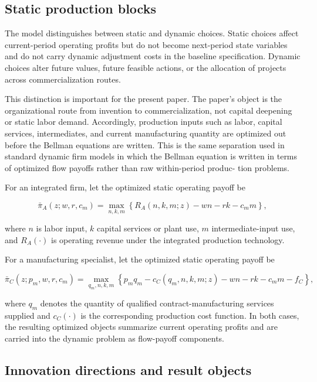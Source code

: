 \documentclass[12pt]{article}
\begin{document}
\subsection{Static production blocks}

The model distinguishes between static and dynamic choices. Static choices affect current-period operating profits but do not become next-period state variables and do not carry dynamic adjustment costs in the baseline specification. Dynamic choices alter future values,
future feasible actions, or the allocation of projects across commercialization routes.

This distinction is important for the present paper. The paper's object is the organizational
route from invention to commercialization, not capital deepening or static labor demand.
Accordingly, production inputs such as labor, capital services, intermediates, and current
manufacturing quantity are optimized out before the Bellman equations are written.
This is the same separation used in standard dynamic firm models in which the Bellman
equation is written in terms of optimized flow payoffs rather than raw within-period produc-
tion problems.

For an integrated firm, let the optimized static operating payoff be

\begin{equation}
\bar{\pi}_A(z;w,r,c_m)=\max_{n,k,m}\left\{R_A(n,k,m;z)-wn-rk-c_m m\right\},
\end{equation}

where $n$ is labor input, $k$ capital services or plant use, $m$ intermediate-input use, and
$R_A(\cdot)$ is operating revenue under the integrated production technology.

For a manufacturing specialist, let the optimized static operating payoff be

\begin{equation}
\bar{\pi}_C(z;p_m,w,r,c_m)=
\max_{q_m,n,k,m}\left\{p_m q_m-c_C(q_m,n,k,m;z)-wn-rk-c_m m-f_C\right\},
\end{equation}

where $q_m$ denotes the quantity of qualified contract-manufacturing services supplied and
$c_C(\cdot)$ is the corresponding production cost function. In both cases, the resulting optimized
objects summarize current operating profits and are carried into the dynamic problem as
flow-payoff components.


\subsection{Innovation directions and result objects}
\end{document}
